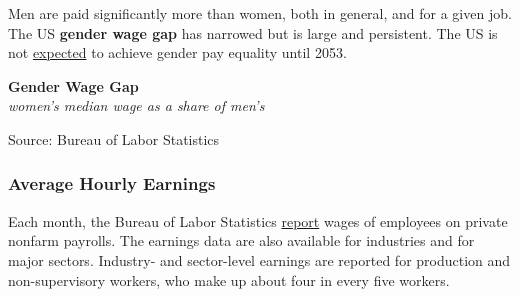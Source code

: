 \documentclass{report}
\makeatletter
\newcommand{\tbllink}[1]{\href{https://raw.githubusercontent.com/bdecon/US-chartbook/master/chartbook/data/#1}{\faTable}}
\newcommand*\short[1]{\expandafter\@gobbletwo\number\numexpr#1\relax}
\newcommand{\absnode}[3]{\node[below right, align=left] at (axis cs: #1,#2) {#3};}
\newcommand{\shdateaxisticks}{
		date coordinates in=x, axis line style={draw=none},
		xmax={2024-01-31},
		max space between ticks=40,	    
		xtick={{1990-01-01}, {1995-01-01}, {2000-01-01}, 
			{2005-01-01}, {2010-01-01}, {2015-01-01}, {2020-01-01}},
		minor xtick={},
		enlarge y limits={0.06}, enlarge x limits={0.01},
		xticklabel style={align=center, yshift=-2pt}, tick label style={inner sep=0pt},
		}
\newcommand{\bbar}[2]{extra #1 ticks = {{#2}}, extra #1 tick labels = ,
		extra #1 tick style = {grid=major, grid style={thick, black!25}},}
\newcommand{\thickline}[4]{\addplot[ultra thick, no markers, color=#1] 
		table [x=#2, y=#3, col sep=comma] {#4};	}
\newcommand{\rbars}{
		\fill[color=black!10] (axis cs:{1990-07-01},\pgfkeysvalueof{/pgfplots/ymin})
			rectangle (axis cs:{1991-03-01}, \pgfkeysvalueof{/pgfplots/ymax});
		\fill[color=black!10] (axis cs:{2007-12-01},\pgfkeysvalueof{/pgfplots/ymin})
			rectangle (axis cs:{2009-07-01}, \pgfkeysvalueof{/pgfplots/ymax});
		\fill[color=black!10] (axis cs:{2001-03-01},\pgfkeysvalueof{/pgfplots/ymin})
			rectangle (axis cs:{2001-11-01}, \pgfkeysvalueof{/pgfplots/ymax});
		\fill[color=black!10] (axis cs:{2020-02-01},\pgfkeysvalueof{/pgfplots/ymin})
			rectangle (axis cs:{2020-05-01}, \pgfkeysvalueof{/pgfplots/ymax});}
\makeatother
\begin{document}
{\begin{minipage}{1.0\textwidth}
\small Men are paid significantly more than women, both in general, and for a given job. The US \textbf{gender wage gap} has narrowed but is large and persistent. The US is not \href{https://iwpr.org/gender-and-racial-wage-gaps-marginally-improve-in-2022-but-pay-equity-still-decades-away/}{expected} to achieve gender pay equality until 2053. 
\end{minipage}

\begin{minipage}{0.45\textwidth}
\normalsize \textbf{Gender Wage Gap}\\
\footnotesize{\textit{women's median wage as a share of men's}}
\vspace{3.8cm}

\hspace{3mm} 

\footnotesize{Source: Bureau of Labor Statistics} \hfill \tbllink{gwg.csv}
\end{minipage} \hspace{5mm} \begin{minipage}{0.27\textwidth}
\small 
\end{minipage}
\newpage
\begin{minipage}{1.0\textwidth}    
\subsubsection*{Average Hourly Earnings}
\small Each month, the Bureau of Labor Statistics \href{https://www.bls.gov/news.release/empsit.nr0.htm}{report} wages of employees on private nonfarm payrolls. The earnings data are also available for industries and for major sectors. Industry- and sector-level earnings are reported for production and non-supervisory workers, who make up about four in every five workers. 
\end{minipage}
\vspace{1mm}

}
\end{document}
